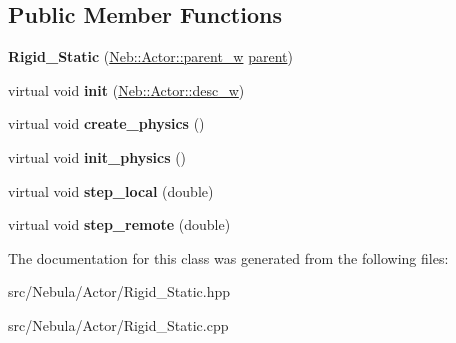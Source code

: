 \subsection*{\-Public \-Member \-Functions}
\begin{DoxyCompactItemize}
\item 
\hypertarget{classNeb_1_1Actor_1_1Rigid__Static_a5716f393482aaf6c1f38c7ca7a01cdf4}{{\bfseries \-Rigid\-\_\-\-Static} (\hyperlink{classNeb_1_1weak__ptr}{\-Neb\-::\-Actor\-::parent\-\_\-w} \hyperlink{classNeb_1_1Actor_1_1parent}{parent})}\label{classNeb_1_1Actor_1_1Rigid__Static_a5716f393482aaf6c1f38c7ca7a01cdf4}

\item 
\hypertarget{classNeb_1_1Actor_1_1Rigid__Static_abfd95812bf80634d43baac7375196b43}{virtual void {\bfseries init} (\hyperlink{classNeb_1_1weak__ptr}{\-Neb\-::\-Actor\-::desc\-\_\-w})}\label{classNeb_1_1Actor_1_1Rigid__Static_abfd95812bf80634d43baac7375196b43}

\item 
\hypertarget{classNeb_1_1Actor_1_1Rigid__Static_ac811bdd9fadf4cdc434ca8696e583f32}{virtual void {\bfseries create\-\_\-physics} ()}\label{classNeb_1_1Actor_1_1Rigid__Static_ac811bdd9fadf4cdc434ca8696e583f32}

\item 
\hypertarget{classNeb_1_1Actor_1_1Rigid__Static_a21b5c36de8bc1b6d8ac3bf8ccf69c12d}{virtual void {\bfseries init\-\_\-physics} ()}\label{classNeb_1_1Actor_1_1Rigid__Static_a21b5c36de8bc1b6d8ac3bf8ccf69c12d}

\item 
\hypertarget{classNeb_1_1Actor_1_1Rigid__Static_af8a2758eb88f3e0d8f7faff3d0e536bb}{virtual void {\bfseries step\-\_\-local} (double)}\label{classNeb_1_1Actor_1_1Rigid__Static_af8a2758eb88f3e0d8f7faff3d0e536bb}

\item 
\hypertarget{classNeb_1_1Actor_1_1Rigid__Static_a1fbb2f59383d23142dc6fcdd8204fafe}{virtual void {\bfseries step\-\_\-remote} (double)}\label{classNeb_1_1Actor_1_1Rigid__Static_a1fbb2f59383d23142dc6fcdd8204fafe}

\end{DoxyCompactItemize}


\-The documentation for this class was generated from the following files\-:\begin{DoxyCompactItemize}
\item 
src/\-Nebula/\-Actor/\-Rigid\-\_\-\-Static.\-hpp\item 
src/\-Nebula/\-Actor/\-Rigid\-\_\-\-Static.\-cpp\end{DoxyCompactItemize}
